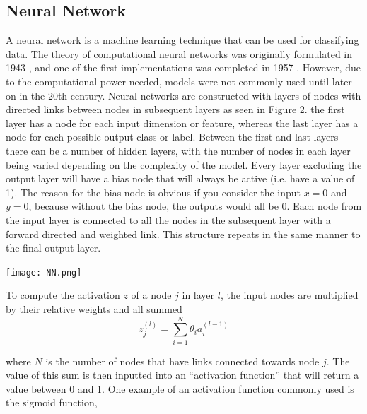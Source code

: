 \documentclass[a4paper,11pt,twoside]{article}
\begin{document}
\subsection{Neural Network}

A neural network is a machine learning technique that can be used for classifying data. The theory of computational neural networks was originally formulated in 1943 \cite{McCulloch1943}, and one of the first implementations was completed in 1957 \cite{Rosenblatt1958}. However, due to the computational power needed, models were not commonly used until later on in the 20th century.  
\newline
\newline
Neural networks are constructed with layers of nodes with directed links between nodes in subsequent layers as seen in Figure 2. the first layer has a node for each input dimension or feature, whereas the last layer has a node for each possible output class or label. Between the first and last layers there can be a number of hidden layers, with the number of nodes in each layer being varied depending on the complexity of the model. Every layer excluding the output layer will have a bias node that will always be active (i.e. have a value of 1). The reason for the bias node is obvious if you consider the input $x=0$ and $y=0$, because without the bias node, the outputs would all be 0. Each node from the input layer is connected to all the nodes in the subsequent layer with a forward directed and weighted link. This structure repeats in the same manner to the final output layer. 

\begin{center}
\texttt{[image: NN.png]}

\end{center}

To compute the activation $z$ of a node $j$ in layer $l$, the input nodes are multiplied by their relative weights and all summed
\begin{equation}
z^{(l)}_j = \sum_{i=1}^N \theta_i a^{(l-1)}_i
\end{equation}

where $N$ is the number of nodes that have links connected towards node $j$. The value of this sum is then inputted into an “activation function” that will return a value between 0 and 1. One example of an activation function commonly used is the sigmoid function, 
\end{document}
